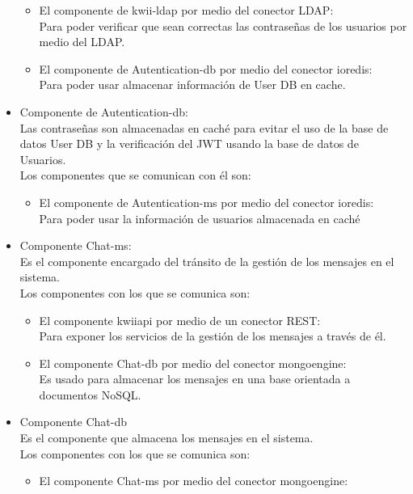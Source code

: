 \begin{itemize}
\begin{itemize}
        \item El componente de kwii-ldap por medio del conector LDAP:\\
        Para poder verificar que sean correctas las contraseñas de los usuarios por medio del LDAP.
        \item El componente de Autentication-db por medio del conector ioredis:\\
        Para poder usar almacenar información de User DB en cache.
    \end{itemize}
    \item Componente de Autentication-db:\\
     Las contraseñas son almacenadas en caché para evitar el uso de la base de datos User DB y la verificación del JWT usando la base de datos de Usuarios.\\
     Los componentes que se comunican con él son:
     \begin{itemize}
        \item El componente de Autentication-ms por medio del conector ioredis:\\
        Para poder usar la información de usuarios almacenada en caché
    \end{itemize}
    \item Componente Chat-ms:\\
    Es el componente encargado del tránsito de la gestión de los mensajes en el sistema.\\
    Los componentes con los que se comunica son:
    \begin{itemize}
        \item El componente kwii\textunderscore api por medio de un conector REST:\\
        Para exponer los servicios de la gestión de los mensajes a través de él.
        \item El componente Chat-db por medio del conector mongoengine:\\
        Es usado para almacenar los mensajes en una base orientada a documentos NoSQL.
    \end{itemize}
    \item Componente Chat-db\\
    Es el componente que almacena los mensajes en el sistema.\\
    Los componentes con los que se comunica son:
    \begin{itemize}
        \item El componente Chat-ms por medio del conector mongoengine:\\

\end{itemize}
\end{itemize}
